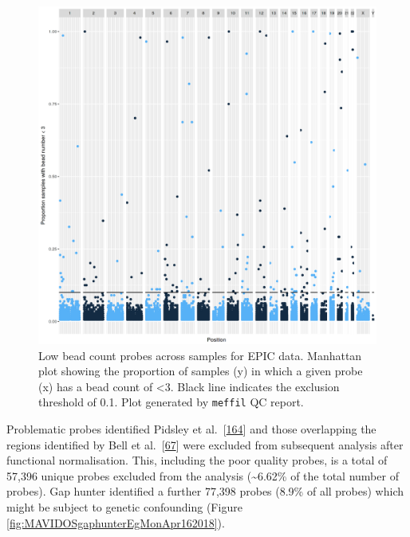 \documentclass[
]{book}
\begin{document}
\begin{figure}

{\centering \includegraphics[width=0.8\linewidth]{figs/MAVIDOSqcEPICbeadNumAcross} 

}

\caption{Low bead count probes across samples for EPIC data. Manhattan plot showing the proportion of samples (y) in which a given probe (x) has a bead count of \textless3. Black line indicates the exclusion threshold of 0.1. Plot generated by \texttt{meffil} QC report.}\label{fig:MAVIDOSqcEPICbeadNumAcross}
\end{figure}



Problematic probes identified Pidsley et al.~{[}\protect\hyperlink{ref-Pidsley2016}{164}{]} and those overlapping the regions identified by Bell et al.~{[}\protect\hyperlink{ref-Bell2017a}{67}{]} were excluded from subsequent analysis after functional normalisation.
This, including the poor quality probes, is a total of 57,396 unique probes excluded from the analysis (\textasciitilde6.62\% of the total number of probes).
Gap hunter identified a further 77,398 probes (8.9\% of all probes) which might be subject to genetic confounding (Figure \ref{fig:MAVIDOSgaphunterEgMonApr162018}).
\end{document}
